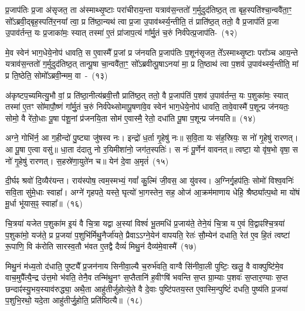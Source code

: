 प्र॒जा\-प॑तिः प्र॒जा अ॑सृजत॒ ता अ॑स्माथ्सृ॒ष्टाः परा॑चीराय॒न्ता यत्राव॑स॒न्ततो॑ ग॒र्मुदुद॑तिष्ठ॒त् ता बृह॒स्पति॑श्चा॒न्ववै॑ता॒ꣳ॒ सो᳚\-ऽब्रवी॒द्बृह॒स्पति॑र॒नया᳚ त्वा॒ प्र ति॑ष्ठा॒न्यथ॑ त्वा प्र॒जा उ॒पाव॑र्थ्स्य॒न्तीति॒ तं प्राति॑ष्ठ॒त् ततो॒ वै प्र॒जा\-प॑तिं प्र॒जा उ॒पाव॑र्तन्त॒ यः प्र॒जाका॑मः॒ स्यात् तस्मा॑ ए॒तं प्रा॑जाप॒त्यं गा᳚र्मु॒तं च॒रुं निर्व॑पेत्प्र॒जा\-प॑ति-~(१२)\ip

मे॒व स्वेन॑ भाग॒\-धेये॒नोप॑ धावति॒ स ए॒वास्मै᳚ प्र॒जां प्र ज॑नयति प्र॒जा\-प॑तिः प॒शून॑सृजत॒ ते᳚\-ऽस्माथ्सृ॒ष्टाः परा᳚ञ्च आय॒न्ते यत्राव॑स॒न्ततो॑ ग॒र्मुदुद॑तिष्ठ॒त् तान्पू॒षा चा॒न्ववै॑ता॒ꣳ॒ सो᳚\-ऽब्रवीत्पू॒षा\-ऽनया॑ मा॒ प्र ति॒ष्ठाथ॑ त्वा प॒शव॑ उ॒पाव॑र्थ्स्य॒न्तीति॒ मां प्र ति॒ष्ठेति॒ सोमो᳚\-ऽब्रवी॒न्मम॒ \mbox{वा~-~(१३)\ip}

अ॑कृष्टप॒च्यमित्यु॒भौ वां॒ प्र ति॑ष्ठा॒नीत्य॑ब्रवी॒त्तौ प्राति॑ष्ठ॒त् ततो॒ वै प्र॒जा\-प॑तिं प॒शव॑ उ॒पाव॑र्तन्त॒ यः प॒शुका॑मः॒ स्यात् तस्मा॑ ए॒तꣳ सो॑मापौ॒ष्णं गा᳚र्मु॒तं च॒रुं निर्व॑पेथ्सोमापू॒षणा॑वे॒व स्वेन॑ भाग॒\-धेये॒नोप॑ धावति॒ तावे॒वास्मै॑ प॒शून्प्र ज॑नयतः॒ सोमो॒ वै रे॑तो॒धाः पू॒षा प॑शू॒नां प्र॑जनयि॒ता सोम॑ ए॒वास्मै॒ रेतो॒ दधा॑ति पू॒षा प॒शून्प्र ज॑नयति॥~(१४)\ip

{\anuvakamend[{व॒पे॒त्प्र॒जा\-प॑तिं॒ वै दधा॑ति पू॒षा त्रीणि॑ च}]}

अग्ने॒ गोभि॑र्न॒ आ ग॒हीन्दो॑ पु॒ष्ट्या जु॑षस्व नः। इन्द्रो॑ ध॒र्ता गृ॒हेषु॑ नः॥ स॒वि॒ता यः स॑ह॒स्रियः॒ स नो॑ गृ॒हेषु॑ रारणत्। आ पू॒षा ए॒त्वा वसु॑॥ धा॒ता द॑दातु नो र॒यिमीशा॑नो॒ जग॑त॒स्पतिः॑। स नः॑ पू॒र्णेन॑ वावनत्॥ त्वष्टा॒ यो वृ॑ष॒भो वृषा॒ स नो॑ गृ॒हेषु॑ रारणत्। स॒हस्रे॑णा॒युते॑न च॥ येन॑ दे॒वा अ॒मृतं॑~(१५)\ip

दी॒र्घꣴ श्रवो॑ दि॒व्यैर॑यन्त। राय॑स्पोष॒ त्वम॒स्मभ्यं॒ गवां᳚ कु॒ल्मिं जी॒वस॒ आ यु॑वस्व। अ॒ग्निर्गृ॒हप॑तिः॒ सोमो॑ विश्व॒वनिः॑ सवि॒ता सु॑\-मे॒धाः स्वाहा᳚। अग्ने॑ गृहपते॒ यस्ते॒ घृत्यो॑ भा॒गस्तेन॒ सह॒ ओज॑ आ॒\-क्रम॑\-मा\-णाय धेहि॒ श्रैष्ठ्या᳚त्प॒थो मा यो॑षं मू॒र्धा भू॑यास॒ꣴ॒ स्वाहा᳚॥~(१६)\ip

{\anuvakamend[{अ॒मृत॑म॒ष्टात्रिꣳ॑शच्च}]}

चि॒त्रया॑ यजेत प॒शुका॑म इ॒यं वै चि॒त्रा यद्वा अ॒स्यां विश्वं॑ भू॒तमधि॑ प्र॒जाय॑ते॒ तेने॒यं चि॒त्रा य ए॒वं वि॒द्वाꣴश्चि॒त्रया॑ प॒शुका॑मो॒ यज॑ते॒ प्र प्र॒जया॑ प॒शुभि॑र्मिथु॒नैर्जा॑यते॒ प्रैवा\-ऽऽ\-ग्ने॒येन॑ वापयति॒ रेतः॑ सौ॒म्येन॑ दधाति॒ रेत॑ ए॒व हि॒तं त्वष्टा॑ रू॒पाणि॒ वि क॑रोति सारस्व॒तौ भ॑वत ए॒तद्वै दैव्यं॑ मिथु॒नं दैव्य॑मे॒वास्मै॑~(१७)\ip

मिथु॒नं म॑ध्य॒तो द॑धाति॒ पुष्ट्यै᳚ प्र॒जन॑नाय सिनीवा॒ल्यै च॒रुर्भ॑वति॒ वाग्वै सि॑नीवा॒ली पुष्टिः॒ खलु॒ वै वाक्पुष्टि॑मे॒व वाच॒मुपै᳚त्यै॒न्द्र उ॑त्त॒मो भ॑वति॒ तेनै॒व तन्मि॑थु॒नꣳ स॒प्तैतानि॑ ह॒वीꣳषि॑ भवन्ति स॒प्त ग्रा॒म्याः प॒शवः॑ स॒प्तार॒ण्याः स॒प्त छन्दाꣴ॑स्यु॒भय॒स्याव॑रुद्ध्या॒ अथै॒ता आहु॑तीर्जुहोत्ये॒ते वै दे॒वाः पुष्टि॑पतय॒स्त ए॒वास्मि॒न्पुष्टिं॑ दधति॒ पुष्य॑ति प्र॒जया॑ प॒शुभि॒रथो॒ यदे॒ता आहु॑तीर्जु॒होति॒ प्रति॑ष्ठित्यै॥~(१८)\ip

